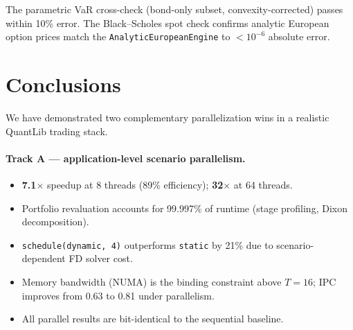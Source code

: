 \documentclass[11pt,twocolumn]{article}
\begin{document}
The parametric VaR cross-check (bond-only subset, convexity-corrected)
passes within 10\% error.  The Black--Scholes spot check confirms
analytic European option prices match the \texttt{AnalyticEuropeanEngine}
to $< 10^{-6}$ absolute error.

\section{Conclusions}

We have demonstrated two complementary parallelization wins in a
realistic QuantLib trading stack.

\paragraph{Track A --- application-level scenario parallelism.}
\begin{itemize}[noitemsep]
  \item \textbf{7.1$\times$} speedup at 8 threads (89\% efficiency);
    \textbf{32$\times$} at 64 threads.
  \item Portfolio revaluation accounts for 99.997\% of runtime
    (stage profiling, Dixon decomposition).
  \item \texttt{schedule(dynamic, 4)} outperforms \texttt{static}
    by 21\% due to scenario-dependent FD solver cost.
  \item Memory bandwidth (NUMA) is the binding constraint above
    $T = 16$; IPC improves from 0.63 to 0.81 under parallelism.
  \item All parallel results are bit-identical to the sequential
    baseline.
\end{itemize}
\end{document}
